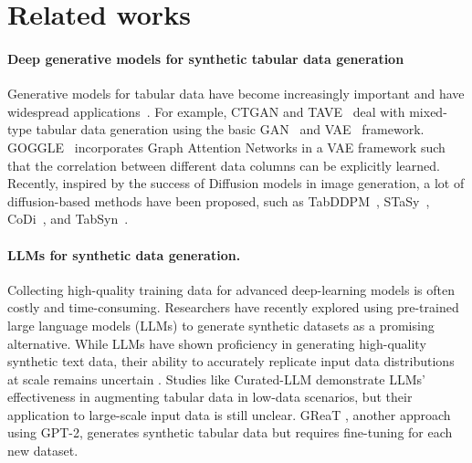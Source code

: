 \section{Related works} \label{sec:related_works}
\paragraph{Deep generative models for synthetic tabular data generation}
Generative models for tabular data have become increasingly important and have widespread applications~\cite {privacy, TabCSDI, privacy_health}. For example, CTGAN and TAVE~\citep{ctgan} deal with mixed-type tabular data generation using the basic GAN~\citep{gan} and VAE~\citep{vae} framework. GOGGLE~\citep{goggle} incorporates Graph Attention Networks in a VAE framework such that the correlation between different data columns can be explicitly learned. Recently, inspired by the success of Diffusion models in image generation, a lot of diffusion-based methods have been proposed, such as TabDDPM~\citep{tabddpm}, STaSy~\citep{stasy}, CoDi~\citep{codi}, and TabSyn~\citep{tabsyn}.

\paragraph{LLMs for synthetic data generation.}
Collecting high-quality training data for advanced deep-learning models is often costly and time-consuming. Researchers have recently explored using pre-trained large language models (LLMs) to generate synthetic datasets as a promising alternative. While LLMs have shown proficiency in generating high-quality synthetic text data, their ability to accurately replicate input data distributions at scale remains uncertain \citep{xu2024llms}. Studies like Curated-LLM \citep{cllm} demonstrate LLMs' effectiveness in augmenting tabular data in low-data scenarios, but their application to large-scale input data is still unclear. GReaT \citep{great}, another approach using GPT-2, generates synthetic tabular data but requires fine-tuning for each new dataset.

